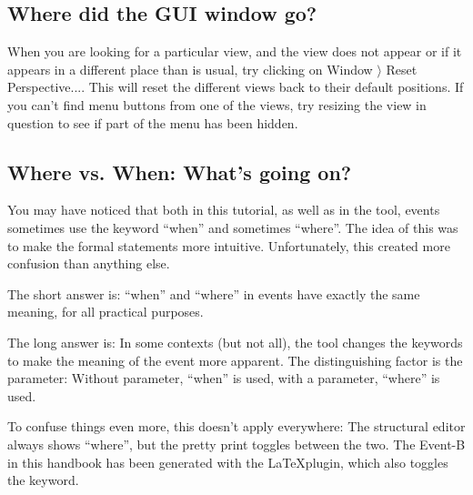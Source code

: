 \subsection{Where did the GUI window go?}

When you are looking for a particular view, and the view does not appear or if it appears in a different place than is usual, try clicking on \textsf{Window $\rangle $ Reset Perspective...}. This will reset the different views back to their default positions. If you can't find menu buttons from one of the views, try resizing the view in question to see if part of the menu has been hidden.

\subsection{Where vs. When: What's going on?}

You may have noticed that both in this tutorial, as well as in the tool, events sometimes use the keyword ``when'' and sometimes ``where''.  The idea of this was to make the formal statements more intuitive.  Unfortunately, this created more confusion than anything else.

The short answer is: ``when'' and ``where'' in events have exactly the same meaning, for all practical purposes.

The long answer is: In some contexts (but not all), the tool changes the keywords to make the meaning of the event more apparent.  The distinguishing factor is the parameter: Without parameter, ``when'' is used, with a parameter, ``where'' is used.

To confuse things even more, this doesn't apply everywhere: The structural editor always shows ``where'', but the pretty print toggles between the two.  The Event-B in this handbook has been generated with the \LaTeX plugin, which also toggles the keyword.


